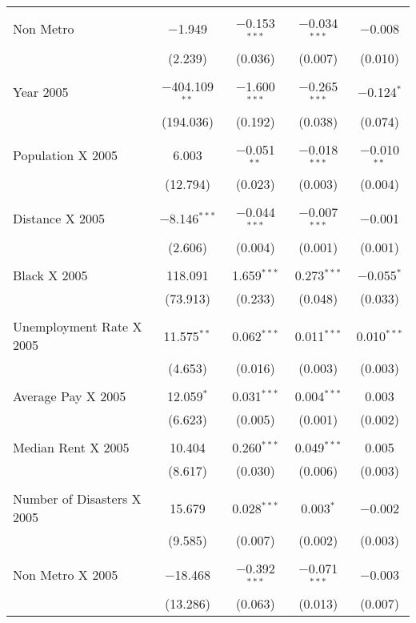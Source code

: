 \documentclass[]{article}
\begin{document}
\begin{table}[!htbp]
\begin{tabular}{@{\extracolsep{5pt}}lcccc}
  & & & & \\ 
 Non Metro & $-$1.949 & $-$0.153$^{***}$ & $-$0.034$^{***}$ & $-$0.008 \\ 
  & (2.239) & (0.036) & (0.007) & (0.010) \\ 
  & & & & \\ 
 Year 2005 & $-$404.109$^{**}$ & $-$1.600$^{***}$ & $-$0.265$^{***}$ & $-$0.124$^{*}$ \\ 
  & (194.036) & (0.192) & (0.038) & (0.074) \\ 
  & & & & \\ 
 Population X 2005 & 6.003 & $-$0.051$^{**}$ & $-$0.018$^{***}$ & $-$0.010$^{**}$ \\ 
  & (12.794) & (0.023) & (0.003) & (0.004) \\ 
  & & & & \\ 
 Distance X 2005 & $-$8.146$^{***}$ & $-$0.044$^{***}$ & $-$0.007$^{***}$ & $-$0.001 \\ 
  & (2.606) & (0.004) & (0.001) & (0.001) \\ 
  & & & & \\ 
 Black X 2005 & 118.091 & 1.659$^{***}$ & 0.273$^{***}$ & $-$0.055$^{*}$ \\ 
  & (73.913) & (0.233) & (0.048) & (0.033) \\ 
  & & & & \\ 
 Unemployment Rate X 2005  & 11.575$^{**}$ & 0.062$^{***}$ & 0.011$^{***}$ & 0.010$^{***}$ \\ 
  & (4.653) & (0.016) & (0.003) & (0.003) \\ 
  & & & & \\ 
 Average Pay X 2005 & 12.059$^{*}$ & 0.031$^{***}$ & 0.004$^{***}$ & 0.003 \\ 
  & (6.623) & (0.005) & (0.001) & (0.002) \\ 
  & & & & \\ 
 Median Rent X 2005 & 10.404 & 0.260$^{***}$ & 0.049$^{***}$ & 0.005 \\ 
  & (8.617) & (0.030) & (0.006) & (0.003) \\ 
  & & & & \\ 
 Number of Disasters X 2005 & 15.679 & 0.028$^{***}$ & 0.003$^{*}$ & $-$0.002 \\ 
  & (9.585) & (0.007) & (0.002) & (0.003) \\ 
  & & & & \\ 
 Non Metro X 2005 & $-$18.468 & $-$0.392$^{***}$ & $-$0.071$^{***}$ & $-$0.003 \\ 
  & (13.286) & (0.063) & (0.013) & (0.007) \\ 

\end{tabular}
\end{table}
\end{document}
